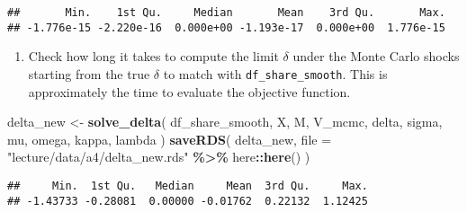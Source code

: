 \documentclass[
]{book}
\newenvironment{Shaded}{\begin{snugshade}}{\end{snugshade}}
\newcommand{\AttributeTok}[1]{\textcolor[rgb]{0.13,0.29,0.53}{#1}}
\newcommand{\FunctionTok}[1]{\textcolor[rgb]{0.13,0.29,0.53}{\textbf{#1}}}
\newcommand{\NormalTok}[1]{#1}
\newcommand{\OtherTok}[1]{\textcolor[rgb]{0.56,0.35,0.01}{#1}}
\newcommand{\SpecialCharTok}[1]{\textcolor[rgb]{0.81,0.36,0.00}{\textbf{#1}}}
\newcommand{\StringTok}[1]{\textcolor[rgb]{0.31,0.60,0.02}{#1}}
\providecommand{\tightlist}{%
  \setlength{\itemsep}{0pt}\setlength{\parskip}{0pt}}
\begin{document}
\begin{verbatim}
##       Min.    1st Qu.     Median       Mean    3rd Qu.       Max. 
## -1.776e-15 -2.220e-16  0.000e+00 -1.193e-17  0.000e+00  1.776e-15
\end{verbatim}

\begin{enumerate}
\def\labelenumi{\arabic{enumi}.}
\setcounter{enumi}{8}
\tightlist
\item
  Check how long it takes to compute the limit \(\delta\) under the Monte Carlo shocks starting from the true \(\delta\) to match with \texttt{df\_share\_smooth}. This is approximately the time to evaluate the objective function.
\end{enumerate}

\begin{Shaded}
\begin{Highlighting}[]
\NormalTok{delta\_new }\OtherTok{\textless{}{-}}
  \FunctionTok{solve\_delta}\NormalTok{(}
\NormalTok{    df\_share\_smooth, }
\NormalTok{    X, }
\NormalTok{    M, }
\NormalTok{    V\_mcmc, }
\NormalTok{    delta, }
\NormalTok{    sigma, }
\NormalTok{    mu, }
\NormalTok{    omega, }
\NormalTok{    kappa, }
\NormalTok{    lambda}
\NormalTok{  )}
\FunctionTok{saveRDS}\NormalTok{(}
\NormalTok{  delta\_new, }
  \AttributeTok{file =} \StringTok{"lecture/data/a4/delta\_new.rds"} \SpecialCharTok{\%\textgreater{}\%}\NormalTok{ here}\SpecialCharTok{::}\FunctionTok{here}\NormalTok{()}
\NormalTok{)}
\end{Highlighting}
\end{Shaded}

\begin{Shaded}
\end{Shaded}

\begin{verbatim}
##     Min.  1st Qu.   Median     Mean  3rd Qu.     Max. 
## -1.43733 -0.28081  0.00000 -0.01762  0.22132  1.12425
\end{verbatim}
\end{document}

